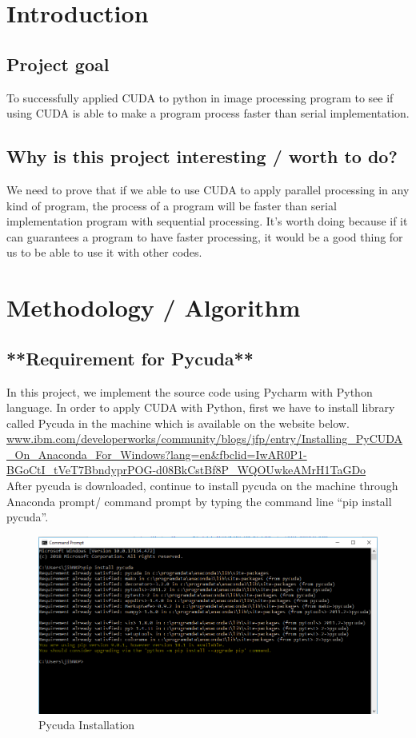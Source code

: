 \documentclass[11pt]{article}
\begin{document}
\section{Introduction}\label{sec:intro}
\subsection{Project goal}
To successfully applied CUDA to python in image processing program to see if using CUDA is able to make a program process faster than serial implementation.
\subsection{Why is this project interesting / worth to do?}
We need to prove that if we able to use CUDA to apply parallel processing in any kind of program, the process of a program will be faster than serial implementation program with sequential processing. It's worth doing because if it can guarantees a program to have faster processing, it would be a good thing for us to be able to use it with other codes.


\newpage
\section{Methodology / Algorithm}\label{sec:method}
\subsection*{**Requirement for Pycuda**}
In this project, we implement the source code using Pycharm with Python language. In order to apply CUDA with Python, first we have to install library called Pycuda in the machine which is available on the website below.\\
[0.1cm] 
\url{www.ibm.com/developerworks/community/blogs/jfp/entry/Installing_PyCUDA_On_Anaconda_For_Windows?lang=en&fbclid=IwAR0P1-BGoCtI_tVeT7BbndyprPOG-d08BkCstBf8P_WQOUwkeAMrH1TaGDo}\\
[0.1cm] 
After pycuda is downloaded, continue to install pycuda on the machine through Anaconda prompt/ command prompt by typing the command line “pip install pycuda”\cite{Ibm}.

\begin{figure}[h]
\centering
\includegraphics[scale=0.6]{cmd}
\caption{Pycuda Installation}
\end{figure}
\end{document}
